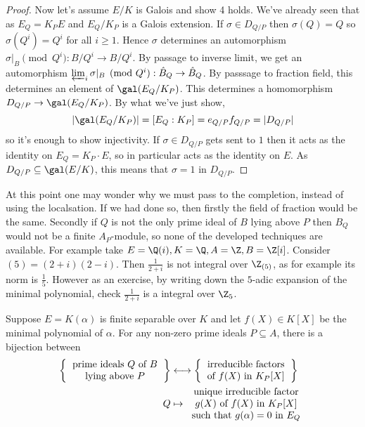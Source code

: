 \documentclass[a4paper]{article}
\begin{document}
\begin{proof}
  Now let's assume \(E/K\) is Galois and show 4 holds. We've already seen that as \(E_Q = K_P E\) and \(E_Q/K_P\) is a Galois extension. If \(\sigma \in D_{Q/P}\) then \(\sigma(Q) = Q\) so \(\sigma(Q^i) = Q^i\) for all \(i \geq 1\). Hence \(\sigma\) determines an automorphism \(\sigma|_B \pmod{Q^i}: B/Q^i \to B/Q^i\). By passage to inverse limit, we get an automorphism \(\varprojlim_i \sigma|_B \pmod{Q^i}: \hat B_Q \to \hat B_Q\). By passsage to fraction field, this determines an element of \(\gal(E_Q/K_P)\). This determines a homomorphism \(D_{Q/P} \to \gal(E_Q/K_P)\). By what we've just show,
  \[
    |\gal(E_Q/K_P)| = [E_Q: K_P] = e_{Q/P} f_{Q/P} = |D_{Q/P}|
  \]
  so it's enough to show injectivity. If \(\sigma \in D_{Q/P}\) gets sent to \(1\) then it acts as the identity on \(E_Q = K_P \cdot E\), so in particular acts as the identity on \(E\). As \(D_{Q/P} \subseteq \gal(E/K)\), this means that \(\sigma = 1\) in \(D_{Q/P}\).
\end{proof}

At this point one may wonder why we must pass to the completion, instead of using the localsation. If we had done so, then firstly the field of fraction would be the same. Secondly if \(Q\) is not the only prime ideal of \(B\) lying above \(P\) then \(B_Q\) would not be a finite \(A_P\)-module, so none of the developed techniques are available. For example take \(E = \Q(i), K = \Q, A = \Z, B = \Z[i]\). Consider \((5) = (2 + i)(2 - i)\). Then \(\frac{1}{2 + i}\) is not integral over \(\Z_{(5)}\), as for example its norm is \(\frac{1}{5}\). However as an exercise, by writing down the \(5\)-adic expansion of the minimal polynomial, check \(\frac{1}{2 + i}\) is a integral over \(\Z_5\).

\begin{corollary}
  Suppose \(E = K(\alpha)\) is finite separable over \(K\) and let \(f(X) \in K[X]\) be the minimal polynomial of \(\alpha\). For any non-zero prime ideals \(P \subseteq A\), there is a bijection between
  \begin{align*}
    \left\{
    \begin{tabular}{c}
      prime ideals \(Q\) of \(B\) \\
      lying above \(P\)
    \end{tabular}
    \right\}
    &\longleftrightarrow
      \left\{
      \begin{tabular}{c}
        irreducible factors \\
        of \(f(X)\) in \(K_P[X]\)
      \end{tabular}
      \right\}
    \\
    Q &\mapsto
        \begin{tabular}{c}
          unique irreducible factor \\
          \(g(X)\) of \(f(X)\) in \(K_P[X]\) \\
          such that \(g(\alpha) = 0\) in \(E_Q\)
        \end{tabular}
  \end{align*}
\end{corollary}
\end{document}
